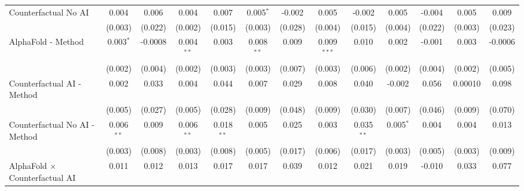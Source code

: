 \begin{tabular}{lcccccccccccc}
   Counterfactual No AI                                       & 0.004          & 0.006          & 0.004         & 0.007          & 0.005$^{*}$   & -0.002        & 0.005         & -0.002         & 0.005         & -0.004      & 0.005         & 0.009\\   
                                                              & (0.003)        & (0.022)        & (0.002)       & (0.015)        & (0.003)       & (0.028)       & (0.004)       & (0.015)        & (0.004)       & (0.022)     & (0.003)       & (0.023)\\   
   AlphaFold - Method                                         & 0.003$^{*}$    & -0.0008        & 0.004$^{**}$  & 0.003          & 0.008$^{**}$  & 0.009         & 0.009$^{***}$ & 0.010          & 0.002         & -0.001      & 0.003         & -0.0006\\   
                                                              & (0.002)        & (0.004)        & (0.002)       & (0.003)        & (0.003)       & (0.007)       & (0.003)       & (0.006)        & (0.002)       & (0.004)     & (0.002)       & (0.005)\\   
   Counterfactual AI - Method                                 & 0.002          & 0.033          & 0.004         & 0.044          & 0.007         & 0.029         & 0.008         & 0.040          & -0.002        & 0.056       & 0.00010       & 0.098\\   
                                                              & (0.005)        & (0.027)        & (0.005)       & (0.028)        & (0.009)       & (0.048)       & (0.009)       & (0.030)        & (0.007)       & (0.046)     & (0.009)       & (0.070)\\   
   Counterfactual No AI - Method                              & 0.006$^{**}$   & 0.009          & 0.006$^{**}$  & 0.018$^{**}$   & 0.005         & 0.025         & 0.003         & 0.035$^{**}$   & 0.005$^{*}$   & 0.004       & 0.004         & 0.013\\   
                                                              & (0.003)        & (0.008)        & (0.003)       & (0.008)        & (0.005)       & (0.017)       & (0.006)       & (0.017)        & (0.003)       & (0.005)     & (0.003)       & (0.009)\\   
   AlphaFold $\times$ Counterfactual AI                       & 0.011          & 0.012          & 0.013         & 0.017          & 0.017         & 0.039         & 0.012         & 0.021          & 0.019         & -0.010      & 0.033         & 0.077\\   

\end{tabular}
